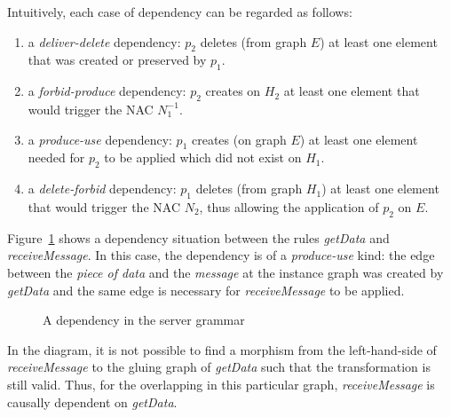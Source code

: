 Intuitively, each case of dependency can be regarded as follows:

\begin{enumerate}
  \item a \emph{deliver-delete} dependency: $p_2$ deletes (from graph $E$) at least one element that was created or preserved by $p_1$.
  \item a \emph{forbid-produce} dependency: $p_2$ creates on $H_2$ at least one element that would trigger the NAC $N_1^{-1}$.
  \item a \emph{produce-use} dependency: $p_1$ creates (on graph $E$) at least one element needed for $p_2$ to be applied which did not exist on $H_1$.
  \item a \emph{delete-forbid} dependency: $p_1$ deletes (from graph $H_1$) at least one element that would trigger the NAC $N_2$, thus allowing the application of $p_2$ on $E$.
\end{enumerate}

\begin{example}
  Figure~\ref{fig:gts:dependency} shows a dependency situation between the rules \emph{getData} and \emph{receiveMessage}. In this case, the dependency is of a \emph{produce-use} kind: the edge between the \emph{piece of data} and the \emph{message} at the instance graph was created by \emph{getData} and the same edge is necessary for \emph{receiveMessage} to be applied.

\begin{figure}[!ht]
  \centering
  \caption{A dependency in the server grammar}\label{fig:gts:dependency}
\end{figure}

  In the diagram, it is not possible to find a morphism from the left-hand-side of \emph{receiveMessage} to the gluing graph of \emph{getData} such that the transformation is still valid. Thus, for the overlapping in this particular graph, \emph{receiveMessage} is causally dependent on \emph{getData}.
\end{example}

